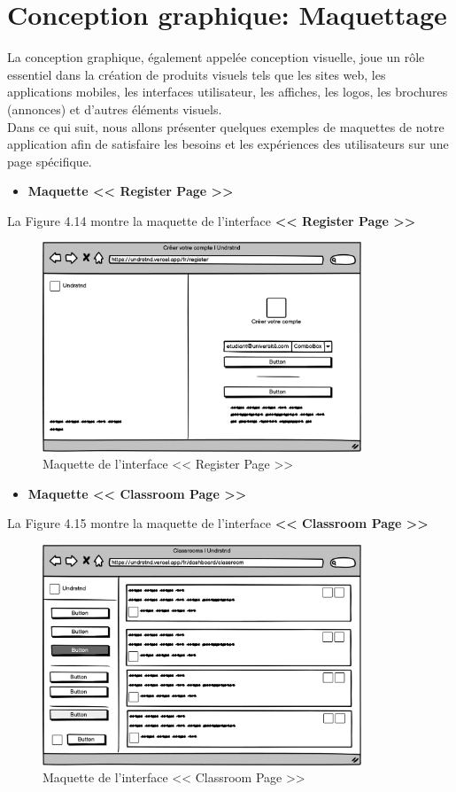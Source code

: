 \section{Conception graphique: Maquettage}
\justifying
La conception graphique, également appelée conception visuelle, joue un rôle essentiel dans la création de produits visuels tels que les sites web, les applications mobiles, les interfaces utilisateur, les affiches, les logos, les brochures (annonces) et d'autres éléments visuels.\\
Dans ce qui suit, nous allons présenter quelques exemples de maquettes de notre application afin de satisfaire les besoins et les expériences des utilisateurs sur une page spécifique.
\begin{itemize}
    \item \textbf{Maquette << Register Page >>}
\end{itemize}
La Figure 4.14 montre la maquette de l’interface \textbf{<< Register Page >>}
\begin{figure}[H]
    \centering
    \includegraphics[width=0.85\textwidth,height=0.4\textwidth]{images/chp4/fig14.png}
    \caption{Maquette de l’interface << Register Page >>}
    \label{fig:Maquette de l’interface <<Register Page>>}    
\end{figure}
\begin{itemize}
    \item \textbf{Maquette << Classroom Page >>}
\end{itemize}
La Figure 4.15 montre la maquette de l’interface \textbf{<< Classroom Page >>}
\begin{figure}[H]
    \centering
    \includegraphics[width=0.85\textwidth,height=0.4\textwidth]{images/chp4/fig15.png}
    \caption{Maquette de l’interface << Classroom Page >>}
    \label{fig:Maquette de l’interface <<Classroom Page>>}    
\end{figure}
